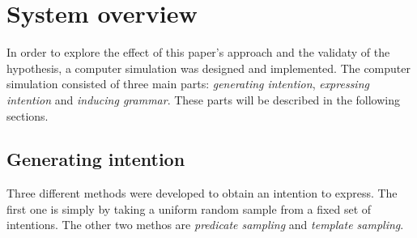\documentclass[a4paper]{article}
\begin{document}
\section{System overview}
\label{sec:system_overview}
In order to explore the effect of this paper's approach and the validaty of the hypothesis, a computer simulation was designed and implemented. The computer simulation consisted of three main parts: \emph{generating intention}, \emph{expressing intention} and \emph{inducing grammar}. These parts will be described in the following sections.
\subsection{Generating intention}
\label{ssec:Generating intention}
Three different methods were developed to obtain an intention to express. The first one is simply by taking a uniform random sample from a fixed set of intentions. The other two methos are \emph{predicate sampling} and \emph{template sampling}.
\end{document}
